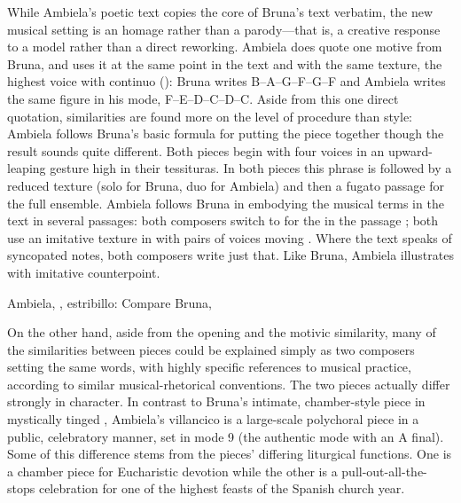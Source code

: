 While Ambiela's poetic text copies the core of Bruna's text verbatim, the new
musical setting is an homage rather than a parody---that is, a creative
response to a model rather than a direct reworking.
Ambiela does quote one motive from Bruna, and uses it at the same point in the
text and with the same texture, the highest voice with continuo
(): Bruna writes
B\fl--A--G--F\sh--G--F\sh{} and Ambiela writes the same figure in his mode,
F--E--D--C\sh--D--C\sh.
Aside from this one direct quotation, similarities are found more on the level
of procedure than style: Ambiela follows Bruna's basic formula for putting the
piece together though the result sounds quite different.
Both pieces begin with four voices in an upward-leaping gesture high in their
tessituras.  
In both pieces this phrase is followed by a reduced texture (solo for Bruna,
duo for Ambiela) and then a fugato passage for the full ensemble.
Ambiela follows Bruna in embodying the musical terms in the text in several
passages: both composers switch to \meterC{} for the  in the
passage ; both use an imitative texture in
 with pairs of voices moving .
Where the text speaks of syncopated notes, both composers write just that.
Like Bruna, Ambiela illustrates  with imitative counterpoint.


{Ambiela, , estribillo: Compare Bruna,
}

On the other hand, aside from the opening and the motivic similarity, many of
the similarities between pieces could be explained simply as two composers
setting the same words, with highly specific references to musical practice,
according to similar musical-rhetorical conventions.
The two pieces actually differ strongly in character.
In contrast to Bruna's intimate, chamber-style piece in mystically tinged
, Ambiela's villancico is a large-scale polychoral piece in
a public, celebratory manner, set in mode 9 (the authentic mode with an A
final).
Some of this difference stems from the pieces' differing liturgical functions. 
One is a chamber piece for Eucharistic devotion while the other is a
pull-out-all-the-stops celebration for one of the highest feasts of the Spanish
church year.


